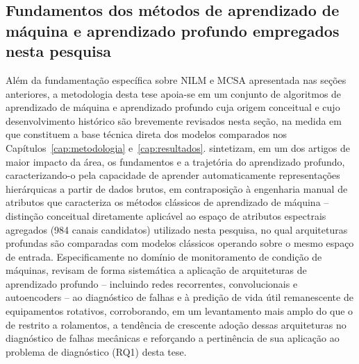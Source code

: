 \documentclass[times,final]{elsarticle}
\begin{document}
\subsection{Fundamentos dos métodos de aprendizado de máquina e aprendizado profundo empregados nesta pesquisa}
\label{sec:ml_dl}
Além da fundamentação específica sobre NILM e MCSA apresentada nas seções anteriores, a metodologia desta tese apoia-se em um conjunto de algoritmos de aprendizado de máquina e aprendizado profundo cuja origem conceitual e cujo desenvolvimento histórico são brevemente revisados nesta seção, na medida em que constituem a base técnica direta dos modelos comparados nos Capítulos~\ref{cap:metodologia} e~\ref{cap:resultados}.
\citet{lecun2015} sintetizam, em um dos artigos de maior impacto da área, os fundamentos e a trajetória do aprendizado profundo, caracterizando-o pela capacidade de aprender automaticamente representações hierárquicas a partir de dados brutos, em contraposição à engenharia manual de atributos que caracteriza os métodos clássicos de aprendizado de máquina -- distinção conceitual diretamente aplicável ao espaço de atributos espectrais agregados (984 canais candidatos) utilizado nesta pesquisa, no qual arquiteturas profundas são comparadas com modelos clássicos operando sobre o mesmo espaço de entrada. Especificamente no domínio de monitoramento de condição de máquinas, \citet{zhao2019dl} revisam de forma sistemática a aplicação de arquiteturas de aprendizado profundo -- incluindo redes recorrentes, convolucionais e autoencoders -- ao diagnóstico de falhas e à predição de vida útil remanescente de equipamentos rotativos, corroborando, em um levantamento mais amplo do que o de \citet{hoang2019} restrito a rolamentos, a tendência de crescente adoção dessas arquiteturas no diagnóstico de falhas mecânicas e reforçando a pertinência de sua aplicação ao problema de diagnóstico (RQ1) desta tese.
\end{document}
